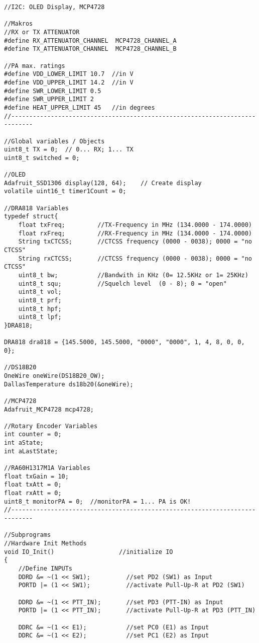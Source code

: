 \begin{lstlisting}[language=Arduino]
//I2C: OLED Display, MCP4728

//Makros
//RX or TX ATTENUATOR
#define RX_ATTENUATOR_CHANNEL  MCP4728_CHANNEL_A
#define TX_ATTENUATOR_CHANNEL  MCP4728_CHANNEL_B

//PA max. ratings
#define VDD_LOWER_LIMIT 10.7  //in V
#define VDD_UPPER_LIMIT 14.2  //in V
#define SWR_LOWER_LIMIT 0.5   
#define SWR_UPPER_LIMIT 2
#define HEAT_UPPER_LIMIT 45   //in degrees
//----------------------------------------------------------------------------

//Global variables / Objects
uint8_t TX = 0;  // 0... RX; 1... TX
uint8_t switched = 0;

//OLED
Adafruit_SSD1306 display(128, 64);    // Create display
volatile uint16_t timer1Count = 0;

//DRA818 Variables
typedef struct{
	float txFreq;         //TX-Frequency in MHz (134.0000 - 174.0000)
	float rxFreq;         //RX-Frequency in MHz (134.0000 - 174.0000)
	String txCTCSS;       //CTCSS frequency (0000 - 0038); 0000 = "no CTCSS" 
	String rxCTCSS;       //CTCSS frequency (0000 - 0038); 0000 = "no CTCSS" 
	uint8_t bw;           //Bandwith in KHz (0= 12.5KHz or 1= 25KHz)
	uint8_t squ;          //Squelch level  (0 - 8); 0 = "open" 
	uint8_t vol;
	uint8_t prf;
	uint8_t hpf;
	uint8_t lpf;
}DRA818;

DRA818 dra818 = {145.5000, 145.5000, "0000", "0000", 1, 4, 8, 0, 0, 0};

//DS18B20
OneWire oneWire(DS18B20_OW); 
DallasTemperature ds18b20(&oneWire);

//MCP4728
Adafruit_MCP4728 mcp4728;

//Rotary Encoder Variables
int counter = 0; 
int aState;
int aLastState;  

//RA60H1317M1A Variables
float txGain = 10;
float txAtt = 0;
float rxAtt = 0;
uint8_t monitorPA = 0;  //monitorPA = 1... PA is OK!
//----------------------------------------------------------------------------

//Subprograms
//Hardware Init Methods
void IO_Init()                  //initialize IO
{
	//Define INPUTs
	DDRD &= ~(1 << SW1);          //set PD2 (SW1) as Input
	PORTD |= (1 << SW1);          //activate Pull-Up-R at PD2 (SW1)    
	
	DDRD &= ~(1 << PTT_IN);       //set PD3 (PTT-IN) as Input
	PORTD |= (1 << PTT_IN);       //activate Pull-Up-R at PD3 (PTT_IN)     
	
	DDRC &= ~(1 << E1);           //set PC0 (E1) as Input    
	DDRC &= ~(1 << E2);           //set PC1 (E2) as Input
	

\end{lstlisting}
